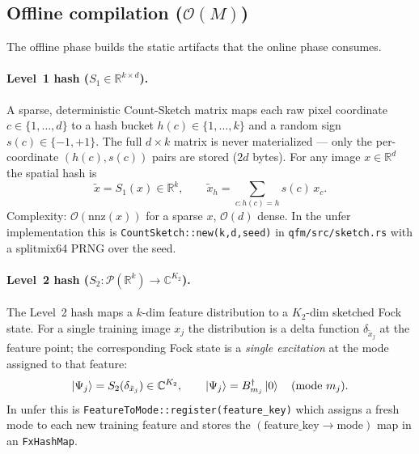 \documentclass[11pt, a4paper]{article}
\newcommand{\Rset}{\mathbb{R}}
\newcommand{\Cset}{\mathbb{C}}
\begin{document}
\subsection{Offline compilation
(\texorpdfstring{$\mathcal{O}(M)$}{O(M)})}

The offline phase builds the static artifacts that the online phase consumes.

\paragraph{Level~1 hash ($S_1\in\Rset^{k\times d}$).} A sparse, deterministic
Count-Sketch matrix maps each raw pixel coordinate $c\in\{1,\dots,d\}$ to a
hash bucket $h(c)\in\{1,\dots,k\}$ and a random sign $s(c)\in\{-1,+1\}$. The
full $d\times k$ matrix is never materialized --- only the per-coordinate
$(h(c),s(c))$ pairs are stored ($2d$ bytes). For any image $x\in\Rset^d$ the
spatial hash is
\begin{equation}
  \tilde x=S_1(x)\in\Rset^k,\qquad \tilde x_h=\sum_{c:h(c)=h}s(c)\,x_c .
\end{equation}
Complexity: $\mathcal{O}(\mathrm{nnz}(x))$ for a sparse $x$, $\mathcal{O}(d)$
dense. In the unfer implementation this is
\texttt{CountSketch::new(k,d,seed)} in \texttt{qfm/src/sketch.rs} with a
splitmix64 PRNG over the seed.

\paragraph{Level~2 hash ($S_2:\mathcal{P}(\Rset^k)\to\Cset^{K_2}$).} The
Level~2 hash maps a $k$-dim feature distribution to a $K_2$-dim sketched
Fock state. For a single training image $x_j$ the distribution is a delta
function $\delta_{\tilde x_j}$ at the feature point; the corresponding Fock
state is a \emph{single excitation} at the mode assigned to that feature:
\begin{equation}
  \ket{\Psi_j}=S_2(\delta_{\tilde x_j})\in\Cset^{K_2},\qquad
  \ket{\Psi_j}=B^\dagger_{m_j}\ket{0}\quad\text{(mode }m_j\text{)} .
\end{equation}
In unfer this is \texttt{FeatureToMode::register(feature\_key)} which assigns
a fresh mode to each new training feature and stores the
$(\text{feature\_key}\to\text{mode})$ map in an \texttt{FxHashMap}.
\end{document}
